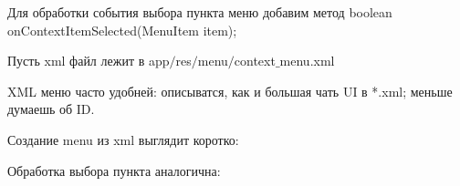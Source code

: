     Для обработки события выбора пункта меню добавим метод
    boolean onContextItemSelected(MenuItem item);
 


    Пусть xml файл лежит в app$/$res$/$menu$/$context$\_$menu.xml


    XML меню часто удобней: описыватся, как и большая чать UI в *.xml; меньше думаешь об ID.

    Создание menu из xml выглядит коротко:


    Обработка выбора пункта аналогична:

